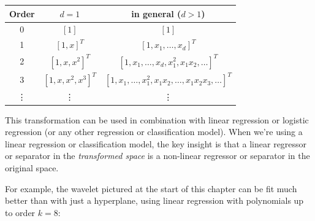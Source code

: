 \begin{center}
  \begin{tabular}{c c c}
    Order  & $d=1$             & in general ($d>1$)       \\
    \hline
    0      & $[1]$             & $[1]$                    \\
    1      & $[1,x]^T$         & $[1,x_1, \ldots, x_d]^T$ \\
    2      & $[1,x,x^2]^T$     & $[1,x_1, \ldots, x_d,
    x_1^2, x_1x_2, \ldots]^T$                             \\
    3      & $[1,x,x^2,x^3]^T$ & $[1,x_1, \ldots,
          x_1^2, x_1x_2, \ldots,
    x_1x_2x_3, \ldots]^T$                                 \\
    \vdots & \vdots            & \vdots
  \end{tabular}
\end{center}

This transformation can be used in combination with linear regression
or logistic regression (or any other regression or classification
model).  When we're using a linear regression or classification model,
the key insight is that a linear regressor or separator in the {\em
    transformed space} is a non-linear regressor or separator in the
original space.


% 
% 
% 

For example, the wavelet pictured at the start of this chapter can be
fit much better than with just a hyperplane, using linear regression
with polynomials up to order $k=8$:

